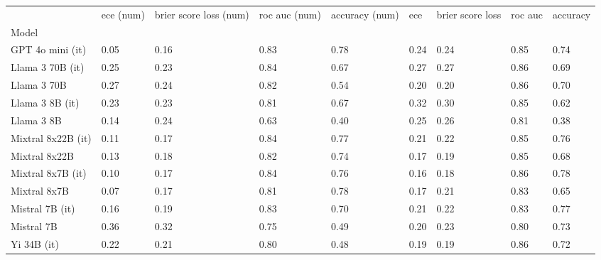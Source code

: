 \begin{tabular}{lllllllll}
\toprule
 & ece (num) & brier score loss (num) & roc auc (num) & accuracy (num) & ece & brier score loss & roc auc & accuracy \\
Model &  &  &  &  &  &  &  &  \\
\midrule
GPT 4o mini (it) & \cellcolor{cyan!25.0} 0.05 & \cellcolor{cyan!25.0} 0.16 & \cellcolor{cyan!20.6} 0.83 & \cellcolor{cyan!24.4} 0.78 & 0.24 & 0.24 & \cellcolor{cyan!17.6} 0.85 & 0.74 \\
Llama 3 70B (it) & 0.25 & 0.23 & \cellcolor{cyan!22.1} 0.84 & 0.67 & 0.27 & 0.27 & \cellcolor{cyan!25.0} 0.86 & 0.69 \\
Llama 3 70B & 0.27 & 0.24 & \cellcolor{cyan!6.7} 0.82 & 0.54 & 0.20 & \cellcolor{cyan!14.9} 0.20 & \cellcolor{cyan!20.8} 0.86 & 0.70 \\
Llama 3 8B (it) & 0.23 & 0.23 & \cellcolor{cyan!0.1} 0.81 & 0.67 & 0.32 & 0.30 & \cellcolor{cyan!13.3} 0.85 & 0.62 \\
Llama 3 8B & 0.14 & 0.24 & 0.63 & \cellcolor{orange!3.7} 0.40 & 0.25 & 0.26 & 0.81 & \cellcolor{orange!20.8} 0.38 \\
Mixtral 8x22B (it) & 0.11 & \cellcolor{cyan!15.5} 0.17 & \cellcolor{cyan!25.0} 0.84 & \cellcolor{cyan!18.9} 0.77 & 0.21 & \cellcolor{cyan!3.6} 0.22 & \cellcolor{cyan!11.2} 0.85 & \cellcolor{cyan!11.1} 0.76 \\
Mixtral 8x22B & 0.13 & \cellcolor{cyan!3.6} 0.18 & \cellcolor{cyan!9.6} 0.82 & \cellcolor{cyan!2.4} 0.74 & \cellcolor{cyan!13.2} 0.17 & \cellcolor{cyan!21.6} 0.19 & \cellcolor{cyan!16.5} 0.85 & 0.68 \\
Mixtral 8x7B (it) & 0.10 & \cellcolor{cyan!15.5} 0.17 & \cellcolor{cyan!22.8} 0.84 & \cellcolor{cyan!12.8} 0.76 & \cellcolor{cyan!16.8} 0.16 & \cellcolor{cyan!25.0} 0.18 & \cellcolor{cyan!19.7} 0.86 & \cellcolor{cyan!25.0} 0.78 \\
Mixtral 8x7B & \cellcolor{cyan!4.0} 0.07 & \cellcolor{cyan!13.1} 0.17 & \cellcolor{cyan!3.7} 0.81 & \cellcolor{cyan!25.0} 0.78 & \cellcolor{cyan!10.6} 0.17 & \cellcolor{cyan!11.5} 0.21 & 0.83 & 0.65 \\
Mistral 7B (it) & 0.16 & 0.19 & \cellcolor{cyan!14.7} 0.83 & 0.70 & 0.21 & \cellcolor{cyan!4.7} 0.22 & 0.83 & \cellcolor{cyan!16.5} 0.77 \\
Mistral 7B & \cellcolor{orange!15.7} 0.36 & 0.32 & 0.75 & 0.49 & 0.20 & 0.23 & 0.80 & 0.73 \\
Yi 34B (it) & 0.22 & 0.21 & 0.80 & 0.48 & \cellcolor{cyan!1.3} 0.19 & \cellcolor{cyan!18.8} 0.19 & \cellcolor{cyan!19.7} 0.86 & 0.72 \\

\end{tabular}
